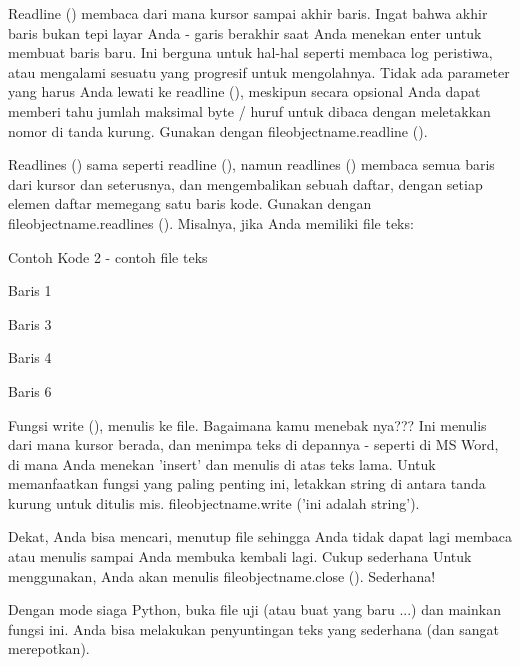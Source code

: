\documentclass[a4paper,12pt]{report}
\begin{document}
\noindent 
\vspace{12pt}
\noindent 
Readline () membaca dari mana kursor sampai akhir baris. Ingat bahwa akhir baris bukan tepi layar Anda - garis berakhir saat Anda menekan enter untuk membuat baris baru. Ini berguna untuk hal-hal seperti membaca log peristiwa, atau mengalami sesuatu yang progresif untuk mengolahnya. Tidak ada parameter yang harus Anda lewati ke readline (), meskipun secara opsional Anda dapat memberi tahu jumlah maksimal byte / huruf untuk dibaca dengan meletakkan nomor di tanda kurung. Gunakan dengan fileobjectname.readline (). \par
\noindent 
\vspace{12pt}
\noindent 
Readlines () sama seperti readline (), namun readlines () membaca semua baris dari kursor dan seterusnya, dan mengembalikan sebuah daftar, dengan setiap elemen daftar memegang satu baris kode. Gunakan dengan fileobjectname.readlines (). Misalnya, jika Anda memiliki file teks: \par
\noindent 
Contoh Kode 2 - contoh file teks \par
\noindent 
\vspace{12pt}
\noindent 
Baris 1 \par
\noindent 
\vspace{12pt}
\noindent 
Baris 3 \par
\noindent 
Baris 4 \par
\noindent 
\vspace{12pt}
\noindent 
Baris 6 \par
\vspace{14pt}
\noindent 
Fungsi write (), menulis ke file. Bagaimana kamu menebak nya??? Ini menulis dari mana kursor berada, dan menimpa teks di depannya - seperti di MS Word, di mana Anda menekan 'insert' dan menulis di atas teks lama. Untuk memanfaatkan fungsi yang paling penting ini, letakkan string di antara tanda kurung untuk ditulis mis. fileobjectname.write ('ini adalah string'). \par
\noindent 
\vspace{12pt}
\noindent 
Dekat, Anda bisa mencari, menutup file sehingga Anda tidak dapat lagi membaca atau menulis sampai Anda membuka kembali lagi. Cukup sederhana Untuk menggunakan, Anda akan menulis fileobjectname.close (). Sederhana! \par
\noindent 
\vspace{12pt}
\noindent 
Dengan mode siaga Python, buka file uji (atau buat yang baru ...) dan mainkan fungsi ini. Anda bisa melakukan penyuntingan teks yang sederhana (dan sangat merepotkan). \par
\end{document}

